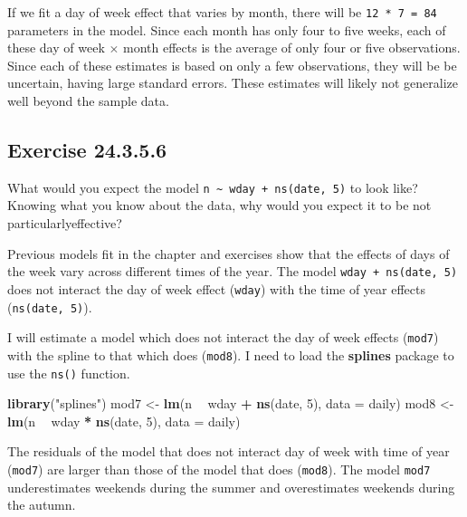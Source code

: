 \documentclass[]{book}
\newenvironment{Shaded}{\begin{snugshade}}{\end{snugshade}}
\newcommand{\DataTypeTok}[1]{\textcolor[rgb]{0.13,0.29,0.53}{#1}}
\newcommand{\DecValTok}[1]{\textcolor[rgb]{0.00,0.00,0.81}{#1}}
\newcommand{\KeywordTok}[1]{\textcolor[rgb]{0.13,0.29,0.53}{\textbf{#1}}}
\newcommand{\NormalTok}[1]{#1}
\newcommand{\OperatorTok}[1]{\textcolor[rgb]{0.81,0.36,0.00}{\textbf{#1}}}
\newcommand{\StringTok}[1]{\textcolor[rgb]{0.31,0.60,0.02}{#1}}
\theoremstyle{plain}
\theoremstyle{remark}
\begin{document}
If we fit a day of week effect that varies by month, there will be \texttt{12\ *\ 7\ =\ 84} parameters in the model.
Since each month has only four to five weeks, each of these day of week \(\times\) month effects is the average of only four or five observations.
Since each of these estimates is based on only a few observations, they will be be uncertain, having large standard errors.
These estimates will likely not generalize well beyond the sample data.

\hypertarget{exercise-24.3.5.6}{%
\subsection*{\texorpdfstring{Exercise {24.3.5.6}}{Exercise 24.3.5.6}}\label{exercise-24.3.5.6}}

What would you expect the model \texttt{n\ \textasciitilde{}\ wday\ +\ ns(date,\ 5)} to look like?
Knowing what you know about the data, why would you expect it to be not particularlyeffective?

Previous models fit in the chapter and exercises show that the effects of days of the week vary across different times of the year.
The model \texttt{wday\ +\ ns(date,\ 5)} does not interact the day of week effect (\texttt{wday}) with the time of year effects (\texttt{ns(date,\ 5)}).

I will estimate a model which does not interact the day of week effects (\texttt{mod7}) with the spline to that which does (\texttt{mod8}).
I need to load the \textbf{splines} package to use the \texttt{ns()} function.

\begin{Shaded}
\begin{Highlighting}[]
\KeywordTok{library}\NormalTok{(}\StringTok{"splines"}\NormalTok{)}
\NormalTok{mod7 <-}\StringTok{ }\KeywordTok{lm}\NormalTok{(n }\OperatorTok{~}\StringTok{ }\NormalTok{wday }\OperatorTok{+}\StringTok{ }\KeywordTok{ns}\NormalTok{(date, }\DecValTok{5}\NormalTok{), }\DataTypeTok{data =}\NormalTok{ daily)}
\NormalTok{mod8 <-}\StringTok{ }\KeywordTok{lm}\NormalTok{(n }\OperatorTok{~}\StringTok{ }\NormalTok{wday }\OperatorTok{*}\StringTok{ }\KeywordTok{ns}\NormalTok{(date, }\DecValTok{5}\NormalTok{), }\DataTypeTok{data =}\NormalTok{ daily)}
\end{Highlighting}
\end{Shaded}

The residuals of the model that does not interact day of week with time of year (\texttt{mod7}) are larger than those of the model that does (\texttt{mod8}).
The model \texttt{mod7} underestimates weekends during the summer and overestimates weekends during the autumn.
\end{document}

